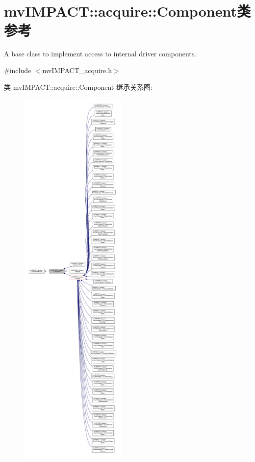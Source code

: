 \hypertarget{classmv_i_m_p_a_c_t_1_1acquire_1_1_component}{\section{mv\+I\+M\+P\+A\+C\+T\+:\+:acquire\+:\+:Component类 参考}
\label{classmv_i_m_p_a_c_t_1_1acquire_1_1_component}
}


A base class to implement access to internal driver components.  




{\ttfamily \#include $<$mv\+I\+M\+P\+A\+C\+T\+\_\+acquire.\+h$>$}



类 mv\+I\+M\+P\+A\+C\+T\+:\+:acquire\+:\+:Component 继承关系图\+:
\nopagebreak
\begin{figure}[H]
\begin{center}
\leavevmode
\includegraphics[height=550pt]{classmv_i_m_p_a_c_t_1_1acquire_1_1_component__inherit__graph}
\end{center}
\end{figure}


